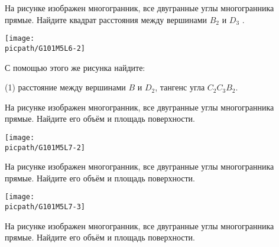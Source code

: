 %
%

\begin{class}[number=1]
	\begin{listofex}
		\item 
		\begin{minipage}[t]{\bodywidth}
			На рисунке изображен многогранник, все двугранные углы многогранника прямые. Найдите квадрат расстояния между вершинами \(B_2\) и \(D_3\) .
		\end{minipage}
		\hspace{0.02\linewidth}
		\begin{minipage}[t]{\picwidth}
			\texttt{[image: \\picpath/G101M5L6-2]}
		\end{minipage}
		\item С помощью этого же рисунка найдите:
		\begin{tasks}(1)
			\task расстояние между вершинами \(B\) и \(D_2\),
			\task тангенс угла \(C_2C_3B_2\).
		\end{tasks}
		\item 
		\begin{minipage}[t]{\bodywidth}
			На рисунке изображен многогранник, все двугранные углы многогранника прямые. Найдите его объём и площадь поверхности.
		\end{minipage}
		\hspace{0.02\linewidth}
		\begin{minipage}[t]{\picwidth}
			\texttt{[image: \\picpath/G101M5L7-2]}
		\end{minipage}
		\item 
		\begin{minipage}[t]{\bodywidth}
			На рисунке изображен многогранник, все двугранные углы многогранника прямые. Найдите его объём и площадь поверхности.
		\end{minipage}
		\hspace{0.02\linewidth}
		\begin{minipage}[t]{\picwidth}
			\texttt{[image: \\picpath/G101M5L7-3]}
		\end{minipage}
		\item 
		\begin{minipage}[t]{\bodywidth}
			На рисунке изображен многогранник, все двугранные углы многогранника прямые. Найдите его объём и площадь поверхности.
		\end{minipage}
		\hspace{0.02\linewidth}

\end{listofex}
\end{class}
